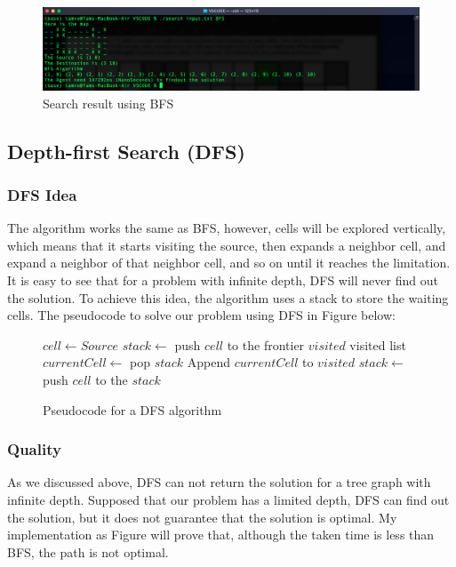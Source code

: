 \documentclass{assignment}
\begin{document}
\begin{figure}[h]
    \centering
    \includegraphics[width=1\textwidth]{./assets/BFS.png}
    \caption{Search result using BFS}
    \label{fig:fig4}
\end{figure}

\subsection{Depth-first Search (DFS)}
\subsubsection{DFS Idea}
The algorithm works the same as BFS, however, cells will be explored vertically, which means that it starts visiting the source, then expands a neighbor cell, and expand a neighbor of that neighbor cell, and so on until it reaches the limitation. It is easy to see that for a problem with infinite depth, DFS will never find out the solution. To achieve this idea, the algorithm uses a stack to store the waiting cells. The pseudocode to solve our problem using DFS in Figure  below: 

\begin{figure}[htbp]
    \centering
    \begin{mdframed}
      \begin{algorithmic}
        \STATE $cell \gets Source$
        \STATE $stack \gets $ push $cell$ to the frontier
        \STATE $visited$ visited list
            \STATE $currentCell \gets$ pop $stack$
            \STATE Append $currentCell$ to $visited$ 
                    \STATE $stack \gets $ push $cell$ to the $stack$
                \ENDIF
            \ENDFOR
        \ENDWHILE
      \end{algorithmic}
    \end{mdframed}
    \caption{Pseudocode for a DFS algorithm}
    \label{fig:fig5}
 \end{figure}

\subsubsection{Quality}
As we discussed above, DFS can not return the solution for a tree graph with infinite depth. Supposed that our problem has a limited depth, DFS can find out the solution, but it does not guarantee that the solution is optimal. My implementation as Figure  will prove that, although the taken time is less than BFS, the path is not optimal. 
\end{document}
